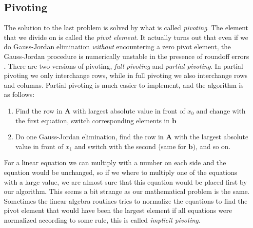 \documentclass[graybox,sectrefs,envcountresetchap,open=right,final]{svmonodo}
\begin{document}
\subsection{Pivoting}
The solution to the last problem is solved by what is called \emph{pivoting}. The element that we divide on is called the \emph{pivot element}. It actually turns out that even if we do Gauss-Jordan elimination \emph{without} encountering a zero pivot element, the Gauss-Jordan procedure is numerically unstable in the presence of roundoff errors \cite{press2007}. There are two versions of pivoting, \emph{full pivoting} and \emph{partial pivoting}. In partial pivoting we only interchange rows, while in full pivoting we also interchange rows and columns. Partial pivoting is much easier to implement, and the algorithm is as follows:
\begin{enumerate}
\item Find the row in $\mathbf{A}$ with largest absolute value in front of $x_0$ and change with the first equation, switch corresponding elements in $\mathbf{b}$

\item Do one Gauss-Jordan elimination, find the row in $\mathbf{A}$ with the largest absolute value in front of $x_1$ and switch with the second (same for $\mathbf{b}$), and so on.
\end{enumerate}

\noindent
For a linear equation we can multiply with a number on each side and the equation would be unchanged, so if we where to multiply one of the equations with a large value, we are almost sure that this equation would be placed first by our algorithm. This seems a bit strange as our mathematical problem is the same. Sometimes the linear algebra routines tries to normalize the equations to find the pivot element that would have been the largest element if all equations were normalized according to some rule, this is called \emph{implicit pivoting}.  
\end{document}
